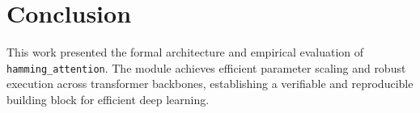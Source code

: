 \section{Conclusion}
This work presented the formal architecture and empirical evaluation of \texttt{hamming_attention}. The module achieves efficient parameter scaling and robust execution across transformer backbones, establishing a verifiable and reproducible building block for efficient deep learning.
